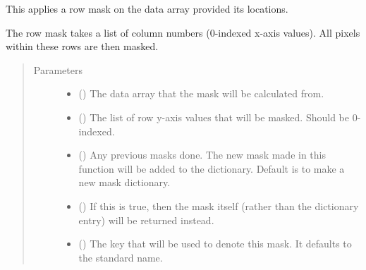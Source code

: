 \documentclass[letterpaper,10pt,english]{sphinxmanual}
\begin{document}
\begin{fulllineitems}
\label{\detokenize{python_docstrings/IfA_Smeargle.echo.masks.masks_echo300:IfA_Smeargle.echo.masks.masks_echo300.echo383_row_mask}}
This applies a row mask on the data array provided its locations.

The row mask takes a list of column numbers (0-indexed x-axis values).
All pixels within these rows are then masked.
\begin{quote}\begin{description}
\item[{Parameters}] \leavevmode\begin{itemize}
\item {} 
 () \textendash{} The data array that the mask will be calculated from.

\item {} 
 () \textendash{} The list of row y-axis values that will be masked. Should be
0-indexed.

\item {} 
 (\sphinxstyleliteralemphasis{\sphinxupquote{ (}}\sphinxstyleliteralemphasis{\sphinxupquote{)}}) \textendash{} Any previous masks done. The new mask made in this function will be
added to the dictionary. Default is to make a new mask dictionary.

\item {} 
 (\sphinxstyleliteralemphasis{\sphinxupquote{ (}}\sphinxstyleliteralemphasis{\sphinxupquote{)}}) \textendash{} If this is true, then the mask itself (rather than the dictionary
entry) will be returned instead.

\item {} 
 (\sphinxstyleliteralemphasis{\sphinxupquote{ (}}\sphinxstyleliteralemphasis{\sphinxupquote{)}}) \textendash{} The key that will be used to denote this mask. It defaults to the
standard name.


\end{itemize}
\end{description}
\end{quote}
\end{fulllineitems}
\end{document}
